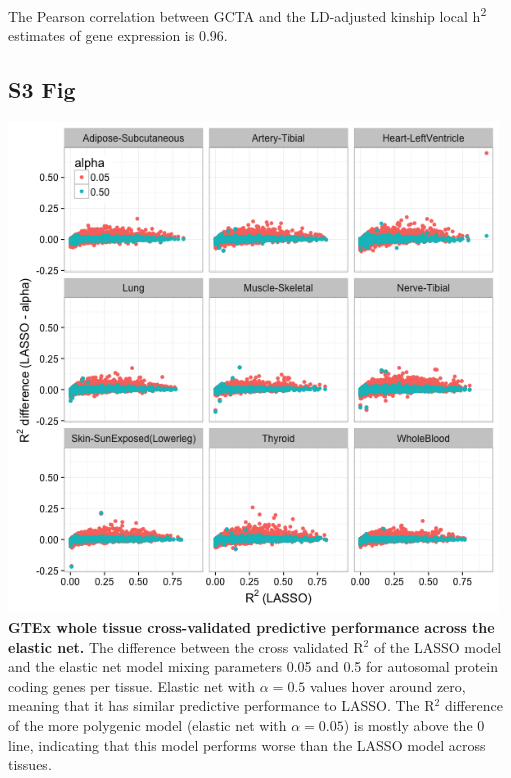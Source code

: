\documentclass[10pt,letterpaper]{article}
\begin{document}
\begin{singlespace}
 The Pearson correlation between GCTA and the LD-adjusted kinship local h\textsuperscript{2} estimates of gene expression is 0.96.

\subsection*{S3 Fig}
\includegraphics[width=13cm]{Figures/GenArch_Supp/S2Fig.png}
\label{S3_Fig}
{\bf GTEx whole tissue cross-validated predictive performance across the elastic net.} The difference between the cross validated R$^2$ of the LASSO model and the elastic net model mixing parameters 0.05 and 0.5 for autosomal protein coding genes per tissue. Elastic net with $\alpha=0.5$ values hover around zero, meaning that it has similar predictive performance to LASSO. The R$^2$ difference of the more polygenic model (elastic net with $\alpha=0.05$) is mostly above the 0 line, indicating that this model performs worse than the LASSO model across tissues.


\end{singlespace}
\end{document}
